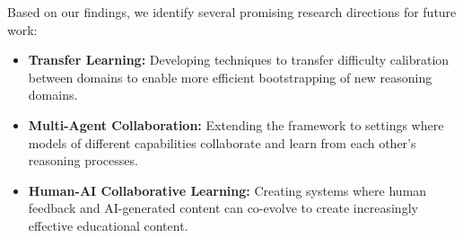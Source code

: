 Based on our findings, we identify several promising research directions for future work:

\begin{itemize}
    \item \textbf{Transfer Learning:} Developing techniques to transfer difficulty calibration between domains to enable more efficient bootstrapping of new reasoning domains.
    
    \item \textbf{Multi-Agent Collaboration:} Extending the framework to settings where models of different capabilities collaborate and learn from each other's reasoning processes.
    
    \item \textbf{Human-AI Collaborative Learning:} Creating systems where human feedback and AI-generated content can co-evolve to create increasingly effective educational content.
\end{itemize}

%


